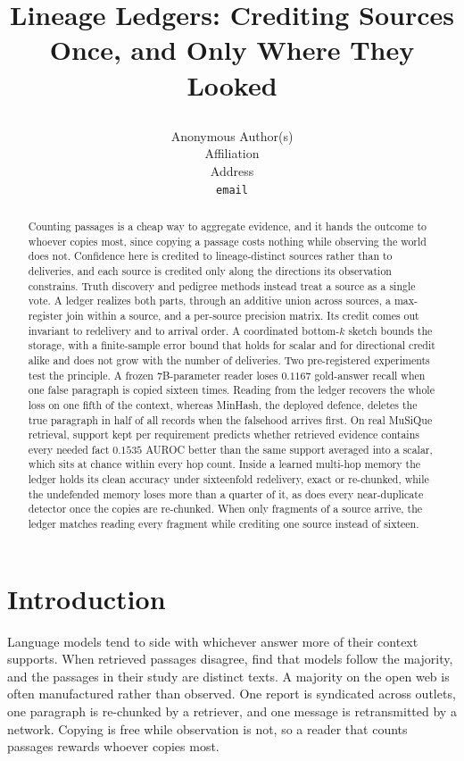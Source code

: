 \documentclass{article}
\title{\raggedright Lineage Ledgers: Crediting Sources Once, and Only Where They Looked\par}
\author{Anonymous Author(s)\\
Affiliation\\
Address\\
\texttt{email}}
\begin{document}
\maketitle

\begin{abstract}
Counting passages is a cheap way to aggregate evidence, and it hands the
outcome to whoever copies most, since copying a passage costs nothing while
observing the world does not. Confidence here is credited to lineage-distinct
sources rather than to deliveries, and each source is credited only along the
directions its observation constrains. Truth discovery and pedigree methods
instead treat a source as a single vote. A ledger realizes both parts, through
an additive union across sources, a max-register join within a source, and a
per-source precision matrix. Its credit comes out invariant to redelivery and
to arrival order. A coordinated bottom-$k$ sketch bounds the storage, with a
finite-sample error bound that holds for scalar and for directional credit
alike and does not grow with the number of deliveries. Two pre-registered
experiments test the principle. A frozen $7$B-parameter reader loses $0.1167$
gold-answer recall when one false paragraph is copied sixteen times. Reading
from the ledger recovers the whole loss on one fifth of the context, whereas
MinHash, the deployed defence, deletes the true paragraph in half of all
records when the falsehood arrives first. On real MuSiQue retrieval, support
kept per requirement predicts whether retrieved evidence contains every needed
fact $0.1535$ AUROC better than the same support averaged into a scalar, which
sits at chance within every hop count. Inside a learned multi-hop memory the
ledger holds its clean accuracy under sixteenfold redelivery, exact or
re-chunked, while the undefended memory loses more than a quarter of it, as
does every near-duplicate detector once the copies are re-chunked. When only
fragments of a source arrive, the ledger matches reading every fragment while
crediting one source instead of sixteen.
\end{abstract}


\section{Introduction}
\label{sec:intro}

Language models tend to side with whichever answer more of their context
supports. When retrieved passages disagree, \citet{xie2024chameleon} find that
models follow the majority, and the passages in their study are distinct texts.
A majority on the open web is often manufactured rather than observed. One
report is syndicated across outlets, one paragraph is re-chunked by a retriever,
and one message is retransmitted by a network.
Copying is free while observation is not, so a reader that counts passages
rewards whoever copies most.
\end{document}
